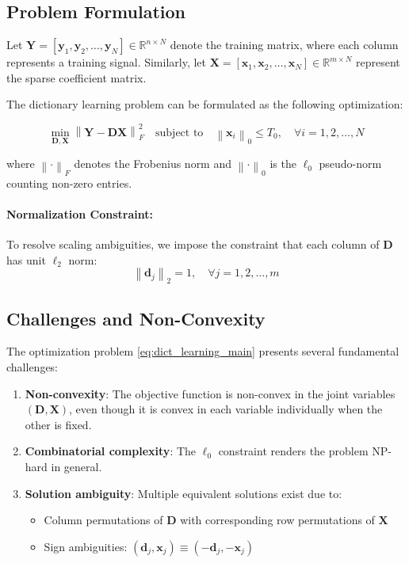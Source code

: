 \documentclass[12pt]{article}
\renewcommand{\vec}[1]{\mathbf{#1}}
\newcommand{\norm}[1]{\left\|#1\right\|}
\newcommand{\R}{\mathbb{R}}
\theoremstyle{definition}
\begin{document}
\subsection{Problem Formulation}

Let $\mathbf{Y} = [\vec{y}_1, \vec{y}_2, \ldots, \vec{y}_N] \in \R^{n \times N}$ denote the training matrix, where each column represents a training signal. Similarly, let $\mathbf{X} = [\vec{x}_1, \vec{x}_2, \ldots, \vec{x}_N] \in \R^{m \times N}$ represent the sparse coefficient matrix.

The dictionary learning problem can be formulated as the following optimization:

\begin{equation}\label{eq:dict_learning_main}
    \min_{\mathbf{D}, \mathbf{X}} \norm{\mathbf{Y} - \mathbf{D}\mathbf{X}}_F^2 \quad \text{subject to} \quad \norm{\vec{x}_i}_0 \leq T_0, \quad \forall i = 1, 2, \ldots, N
\end{equation}

where $\norm{\cdot}_F$ denotes the Frobenius norm and $\norm{\cdot}_0$ is the $\ell_0$ pseudo-norm counting non-zero entries.

\paragraph{Normalization Constraint:} To resolve scaling ambiguities, we impose the constraint that each column of $\mathbf{D}$ has unit $\ell_2$ norm:
\begin{equation}\label{eq:unit_norm}
    \norm{\vec{d}_j}_2 = 1, \quad \forall j = 1, 2, \ldots, m
\end{equation}

\subsection{Challenges and Non-Convexity}

The optimization problem \eqref{eq:dict_learning_main} presents several fundamental challenges:

\begin{enumerate}
    \item \textbf{Non-convexity}: The objective function is non-convex in the joint variables $(\mathbf{D}, \mathbf{X})$, even though it is convex in each variable individually when the other is fixed.

    \item \textbf{Combinatorial complexity}: The $\ell_0$ constraint renders the problem NP-hard in general.

    \item \textbf{Solution ambiguity}: Multiple equivalent solutions exist due to:
          \begin{itemize}
              \item Column permutations of $\mathbf{D}$ with corresponding row permutations of $\mathbf{X}$
              \item Sign ambiguities: $(\vec{d}_j, \vec{x}_j) \equiv (-\vec{d}_j, -\vec{x}_j)$
          \end{itemize}
\end{enumerate}
\end{document}
